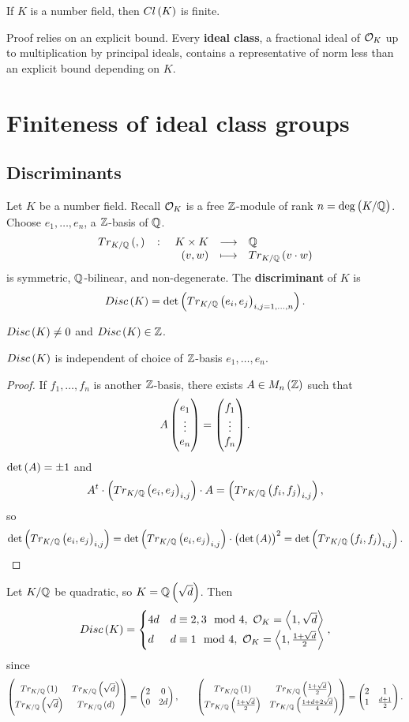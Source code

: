 \begin{theorem}
If $ K $ is a number field, then $ Cl\br{K} $ is finite.
\end{theorem}

Proof relies on an explicit bound. Every \textbf{ideal class}, a fractional ideal of $ \mathcal{O}_K $ up to multiplication by principal ideals, contains a representative of norm less than an explicit bound depending on $ K $.

\pagebreak

\section{Finiteness of ideal class groups}

\subsection{Discriminants}

Let $ K $ be a number field. Recall $ \mathcal{O}_K $ is a free $ \mathbb{Z} $-module of rank $ n = \deg\br{K / \Q} $. Choose $ e_1, \dots, e_n $, a $ \mathbb{Z} $-basis of $ \mathbb{Q} $.
$$ \function[Tr_{K / \Q}\br{,}]{K \times K}{\Q}{\br{v, w}}{Tr_{K / \Q}\br{v \cdot w}} $$
is symmetric, $ \mathbb{Q} $-bilinear, and non-degenerate. The \textbf{discriminant} of $ K $ is
$$ Disc\br{K} = \det\br{Tr_{K / \Q}\br{e_i, e_j}_{i, j = 1, \dots, n}}. $$

\begin{remark*}
$ Disc\br{K} \ne 0 $ and $ Disc\br{K} \in \Z $.
\end{remark*}

\begin{lemma}
$ Disc\br{K} $ is independent of choice of $ \mathbb{Z} $-basis $ e_1, \dots, e_n $.
\end{lemma}

\begin{proof}
If $ f_1, \dots, f_n $ is another $ \mathbb{Z} $-basis, there exists $ A \in M_n\br{\Z} $ such that
$$ A\begin{pmatrix} e_1 \\ \vdots \\ e_n \end{pmatrix} = \begin{pmatrix} f_1 \\ \vdots \\ f_n \end{pmatrix}. $$
$ \det\br{A} = \pm 1 $ and
$$ A^t \cdot \br{Tr_{K / \Q}\br{e_i, e_j}_{i, j}} \cdot A = \br{Tr_{K / \Q}\br{f_i, f_j}_{i, j}}, $$
so
$$ \det\br{Tr_{K / \Q}\br{e_i, e_j}_{i, j}} = \det\br{Tr_{K / \Q}\br{e_i, e_j}_{i, j}} \cdot \br{\det\br{A}}^2 = \det\br{Tr_{K / \Q}\br{f_i, f_j}_{i, j}}. $$
\end{proof}

\begin{example*}
Let $ K / \mathbb{Q} $ be quadratic, so $ K = \Q\br{\sqrt{d}} $. Then
$$ Disc\br{K} =
\begin{cases}
4d & d \equiv 2, 3 \mod 4, \ \OO_K = \abr{1, \sqrt{d}} \\
d & d \equiv 1 \mod 4, \ \OO_K = \abr{1, \tfrac{1 + \sqrt{d}}{2}}
\end{cases},
$$
since
$$ \twobytwo{Tr_{K / \Q}\br{1}}{Tr_{K / \Q}\br{\sqrt{d}}}{Tr_{K / \Q}\br{\sqrt{d}}}{Tr_{K / \Q}\br{d}} = \twobytwo{2}{0}{0}{2d}, \qquad \twobytwo{Tr_{K / \Q}\br{1}}{Tr_{K / \Q}\br{\tfrac{1 + \sqrt{d}}{2}}}{Tr_{K / \Q}\br{\tfrac{1 + \sqrt{d}}{2}}}{Tr_{K / \Q}\br{\tfrac{1 + d + 2\sqrt{d}}{4}}} = \twobytwo{2}{1}{1}{\tfrac{d + 1}{2}}. $$
\end{example*}

